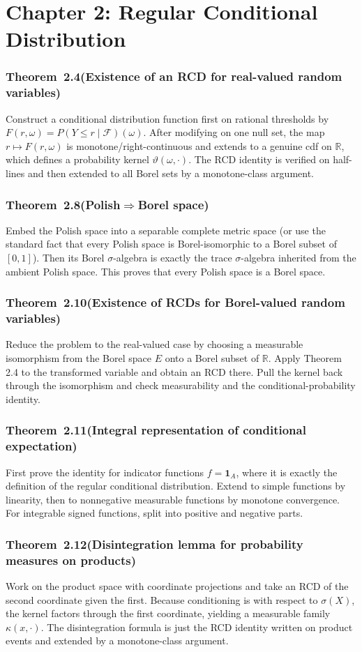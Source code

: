 \documentclass[11pt,a4paper]{article}
\newcommand{\proofcapsule}[4]{%
  \subsubsection*{#1~#2\quad \textnormal{\small(#3)}}%
  #4}
\begin{document}
\section{Chapter 2: Regular Conditional Distribution}
\proofcapsule{Theorem}{2.4}{Existence of an RCD for real-valued random variables}{Construct a conditional distribution function first on rational thresholds by $F(r,\omega)=P(Y\le r\mid\mathcal F)(\omega)$. After modifying on one null set, the map $r\mapsto F(r,\omega)$ is monotone/right-continuous and extends to a genuine cdf on $\mathbb R$, which defines a probability kernel $\vartheta(\omega,\cdot)$. The RCD identity is verified on half-lines and then extended to all Borel sets by a monotone-class argument.}
\proofcapsule{Theorem}{2.8}{Polish$\Rightarrow$Borel space}{Embed the Polish space into a separable complete metric space (or use the standard fact that every Polish space is Borel-isomorphic to a Borel subset of $[0,1]$). Then its Borel $\sigma$-algebra is exactly the trace $\sigma$-algebra inherited from the ambient Polish space. This proves that every Polish space is a Borel space.}
\proofcapsule{Theorem}{2.10}{Existence of RCDs for Borel-valued random variables}{Reduce the problem to the real-valued case by choosing a measurable isomorphism from the Borel space $E$ onto a Borel subset of $\mathbb R$. Apply Theorem 2.4 to the transformed variable and obtain an RCD there. Pull the kernel back through the isomorphism and check measurability and the conditional-probability identity.}
\proofcapsule{Theorem}{2.11}{Integral representation of conditional expectation}{First prove the identity for indicator functions $f=\mathbf 1_A$, where it is exactly the definition of the regular conditional distribution. Extend to simple functions by linearity, then to nonnegative measurable functions by monotone convergence. For integrable signed functions, split into positive and negative parts.}
\proofcapsule{Theorem}{2.12}{Disintegration lemma for probability measures on products}{Work on the product space with coordinate projections and take an RCD of the second coordinate given the first. Because conditioning is with respect to $\sigma(X)$, the kernel factors through the first coordinate, yielding a measurable family $\kappa(x,\cdot)$. The disintegration formula is just the RCD identity written on product events and extended by a monotone-class argument.}
\end{document}
